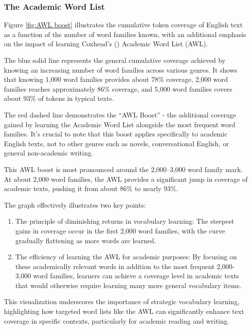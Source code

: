 \subsubsection{The Academic Word List}

Figure \ref{fig:AWL boost} illustrates the cumulative token coverage of English text as a function of the number of word families known, with an additional emphasis on the impact of learning Coxhead's (\citeyear{coxhead2000academic}) Academic Word List (AWL).

The blue solid line represents the general cumulative coverage achieved by knowing an increasing number of word families across various genres. It shows that knowing 1,000 word families provides about 78\% coverage, 2,000 word families reaches approximately 86\% coverage, and 5,000 word families covers about 93\% of tokens in typical texts.

The red dashed line demonstrates the ``AWL Boost'' - the additional coverage gained by learning the Academic Word List alongside the most frequent word families. It's crucial to note that this boost applies specifically to academic English texts, not to other genres such as novels, conversational English, or general non-academic writing.

This AWL boost is most pronounced around the 2,000--3,000 word family mark. At about 2,000 word families, the AWL provides a significant jump in coverage of academic texts, pushing it from about 86\% to nearly 93\%.

The graph effectively illustrates two key points:

\begin{enumerate}
    \item The principle of diminishing returns in vocabulary learning: The steepest gains in coverage occur in the first 2,000 word families, with the curve gradually flattening as more words are learned.
    \item The efficiency of learning the AWL for academic purposes: By focusing on these academically relevant words in addition to the most frequent 2,000-3,000 word families, learners can achieve a coverage level in academic texts that would otherwise require learning many more general vocabulary items.
\end{enumerate}

This visualization underscores the importance of strategic vocabulary learning, highlighting how targeted word lists like the AWL can significantly enhance text coverage in specific contexts, particularly for academic reading and writing.


